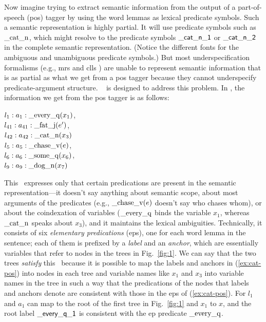 Now imagine trying to extract semantic information from the output of
a part-of-speech ({\sc pos}) tagger by using the word lemmas as
lexical predicate symbols.  Such a semantic representation is highly
partial.  It will use predicate symbols such as $\mathrm{\_cat\_n}$,
which might resolve to the predicate symbols $\mathsf{\_cat\_n\_1}$ or
$\mathsf{\_cat\_n\_2}$ in the complete semantic representation.  (Notice
the different fonts for the ambiguous and unambiguous predicate
symbols.)  But most underspecification formalisms (e.g., {\sc mrs}
\cite{copestake:etal:2005} and {\sc clls} \cite{egg:etal:2001}) are
unable to represent semantic information that is as partial as what we
get from a {\sc pos} tagger because they cannot underspecify
predicate-argument structure.  \rmrs\ \cite{copestake:2007a} is 
designed to address this problem.  In \rmrs, the
information we get from the {\sc pos} tagger is as follows:

\begin{examples}
\item \label{ex:cat-pos}
$l_1:a_1:\mathrm{\_every\_q}(x_1)$, \\
$l_{41}:a_{41}:\mathrm{\_fat\_j}(e')$,\\
$l_{42}:a_{42}:\mathrm{\_cat\_n}(x_3)$\\
$l_5:a_5:\mathrm{\_chase\_v}(e)$, \\
$l_6:a_6:\mathrm{\_some\_q}(x_6)$, \\
$l_9:a_9:\mathrm{\_dog\_n}(x_7)$
\end{examples}

This \rmrs\ expresses only that certain predications are present in
the semantic representation---it doesn't say anything about
semantic scope, about most arguments of the
predicates (e.g., $\mathrm{\_chase\_v}(e)$ doesn't say who chases
whom), or about the coindexation of variables ($\mathrm{\_every\_q}$
binds the variable $x_1$, whereas $\mathrm{\_cat\_n}$ speaks about
$x_3$), and it maintains the lexical ambiguities.  Technically, it
consists of six \emph{elementary predications} ({\sc ep}s), one for
each word lemma in the sentence; each of them is prefixed by a
\emph{label} and an \emph{anchor}, which are essentially variables
that refer to nodes in the trees in Fig.~\ref{fig:1}.  We can say that
the two trees \emph{satisfy} this \rmrs\ because it is possible to map
the labels and anchors in (\ref{ex:cat-pos}) into nodes in each tree
and variable names like 
$x_1$ and $x_3$ into variable names in the tree in such a way that the
predications of the nodes that labels and anchors denote are 
consistent with those in the {\sc ep}s of (\ref{ex:cat-pos}).  For
$l_1$ and $a_1$
can map to the root of the first tree in Fig.~\ref{fig:1} and $x_1$ to
$x$, and the root label 
$\mathsf{\_every\_q\_1}$ is consistent with the {\sc ep} predicate
$\mathrm{\_every\_q}$.


